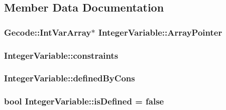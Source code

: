 \subsection{Member Data Documentation}
\hypertarget{class_integer_variable_ab65c2230563c105c5f558fe709ad11b8}{
\subsubsection[{Array\-Pointer}]{\setlength{\rightskip}{0pt plus 5cm}Gecode\-::\-Int\-Var\-Array$\ast$ Integer\-Variable\-::\-Array\-Pointer\hspace{0.3cm}{\ttfamily [protected]}}}\label{class_integer_variable_ab65c2230563c105c5f558fe709ad11b8}
\hypertarget{class_integer_variable_a3622cee463344a82ebec9559a0cc0925}{
\subsubsection[{constraints}]{ Integer\-Variable\-::constraints\hspace{0.3cm}{\ttfamily [protected]}}}\label{class_integer_variable_a3622cee463344a82ebec9559a0cc0925}
\hypertarget{class_integer_variable_aab3394e928b38ae8fb8474a02fffeb80}{
\subsubsection[{defined\-By\-Cons}]{ Integer\-Variable\-::defined\-By\-Cons\hspace{0.3cm}{\ttfamily [protected]}}}\label{class_integer_variable_aab3394e928b38ae8fb8474a02fffeb80}
\hypertarget{class_integer_variable_adab57321e01f48d8c977af72b4507e0b}{
\subsubsection[{is\-Defined}]{\setlength{\rightskip}{0pt plus 5cm}bool Integer\-Variable\-::is\-Defined = false\hspace{0.3cm}{\ttfamily [protected]}}}\label{class_integer_variable_adab57321e01f48d8c977af72b4507e0b}
